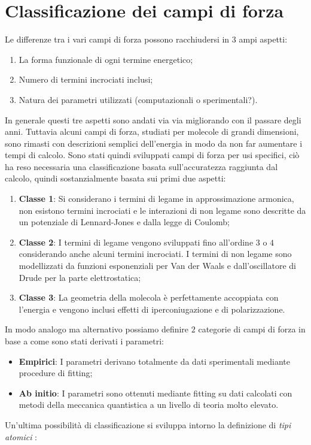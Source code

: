 \documentclass[oneside]{amsbook}
\numberwithin{section}{chapter}
\numberwithin{equation}{section}
\numberwithin{figure}{section}
\begin{document}
\section{Classificazione dei campi di forza}
Le differenze tra i vari campi di forza possono racchiudersi in $3$ ampi aspetti:
\begin{enumerate}
\item La forma funzionale di ogni termine energetico;
\item Numero di termini incrociati inclusi;
\item Natura dei parametri utilizzati (computazionali o sperimentali?).
\end{enumerate}
In generale questi tre aspetti sono andati via via migliorando con il passare degli anni. Tuttavia alcuni campi di forza, studiati per molecole di grandi dimensioni, sono rimasti con descrizioni semplici dell'energia in modo da non far aumentare i tempi di calcolo.
Sono stati quindi sviluppati campi di forza per usi specifici, ciò ha reso necessaria una classificazione basata sull'accuratezza raggiunta dal calcolo, quindi sostanzialmente basata sui primi due aspetti:
\begin{enumerate}
\item \textbf{Classe 1}: Si considerano i termini di legame in approssimazione armonica, non esistono termini incrociati e le interazioni di non legame sono descritte da un potenziale di Lennard-Jones e dalla legge di Coulomb;
\item \textbf{Classe 2}: I termini di legame vengono sviluppati fino all'ordine $3$ o $4$ considerando anche alcuni termini incrociati. I termini di non legame sono modellizzati da funzioni esponenziali per Van der Waals e dall'oscillatore di Drude per la parte elettrostatica;
\item \textbf{Classe 3}: La geometria della molecola è perfettamente accoppiata con l'energia e vengono inclusi effetti di iperconiugazione e di polarizzazione.
\end{enumerate}
In modo analogo ma alternativo possiamo definire $2$ categorie di campi di forza in base a come sono stati derivati i parametri:
\begin{itemize}
\item \textbf{Empirici}: I parametri derivano totalmente da dati sperimentali mediante procedure di fitting;
\item \textbf{Ab initio}: I parametri sono ottenuti mediante fitting su dati calcolati con metodi della meccanica quantistica a un livello di teoria molto elevato.
\end{itemize}
Un'ultima possibilità di classificazione si sviluppa intorno la definizione di \emph{tipi atomici} :
\end{document}
